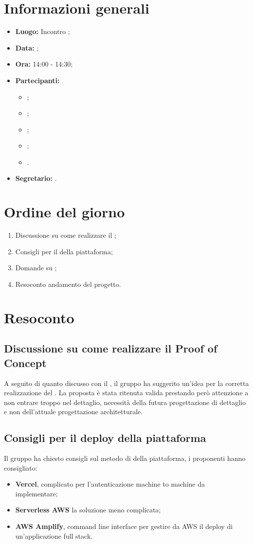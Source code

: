 \section{Informazioni generali}
\begin{itemize}
\item \textbf{Luogo:} Incontro ;
\item \textbf{Data:} \Data;
\item \textbf{Ora:} 14:00 - 14:30;
\item \textbf{Partecipanti:}
	\begin{itemize}
		\item \BL{}; 
		\item \FF{};
		\item \TG{};
		\item \TL{};
		\item \Proponente{}.
	\end{itemize}
\item \textbf{Segretario:} \TG{}.
\end{itemize}

\section{Ordine del giorno}
\begin{enumerate}
	\item Discussione su come realizzare il ;
	\item Consigli per il  della piattaforma;
	\item Domande su ;
	\item Resoconto andamento del progetto.
\end{enumerate}

\section{Resoconto}
\subsection{Discussione su come realizzare il Proof of Concept}
A seguito di quanto discusso con il \CR{}, il gruppo ha suggerito un'idea per la corretta realizzazione del . La proposta è stata ritenuta valida prestando però attenzione a non entrare troppo nel dettaglio, necessità della futura progettazione di dettaglio e non dell'attuale progettazione architetturale.
\subsection{Consigli per il deploy della piattaforma}
Il gruppo ha chiesto consigli sul metodo di  della piattaforma, i proponenti hanno consigliato:
\begin{itemize}
	\item \textbf{Vercel}, complicato per l'autenticazione machine to machine da implementare;
	\item \textbf{Serverless AWS} la soluzione meno complicata;
	\item \textbf{AWS Amplify}, command line interface per gestire da AWS il deploy di un'applicazione full stack.
\end{itemize}
